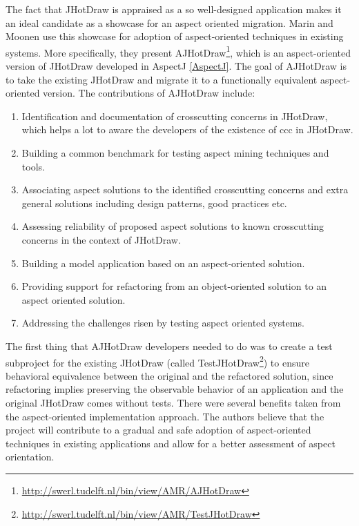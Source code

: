 The fact that JHotDraw is appraised as a so well-designed application makes it an ideal candidate as a showcase for an aspect oriented migration. 
Marin and Moonen \cite{marinajhotdraw} use this showcase for adoption of aspect-oriented techniques in existing systems. 
More specifically, they present AJHotDraw\footnote{\url{http://swerl.tudelft.nl/bin/view/AMR/AJHotDraw}}, which is an aspect-oriented version of JHotDraw developed in AspectJ \ref{AspectJ}. 
The goal of AJHotDraw is to take the existing JHotDraw and migrate it to a functionally equivalent aspect-oriented version. 
The contributions of AJHotDraw include: 

\begin{enumerate}
	\item Identification and documentation of crosscutting concerns in JHotDraw, which helps a lot to aware the developers of the existence of \ac{ccc} in JHotDraw.

	\item Building a common benchmark for testing aspect mining techniques and tools. 

	\item Associating aspect solutions to the identified crosscutting concerns and extra general solutions including design patterns, good practices etc. 

	\item Assessing reliability of proposed aspect solutions to known crosscutting concerns in the context of JHotDraw. 

	\item Building a model application based on an aspect-oriented solution.
	
	\item Providing support for refactoring from an object-oriented solution to an aspect oriented solution.
	
	\item Addressing the challenges risen by testing aspect oriented systems.
\end{enumerate}

The first thing that AJHotDraw developers needed to do was to create a test subproject for the existing JHotDraw (called TestJHotDraw\footnote{\url{http://swerl.tudelft.nl/bin/view/AMR/TestJHotDraw}}) to ensure behavioral equivalence between the original and the refactored solution, since refactoring implies preserving the observable behavior of an application\cite{fowler2009refactoring} and the original JHotDraw comes without tests. 
There were several benefits taken from the aspect-oriented implementation approach\cite{marinajhotdraw}. 
The authors believe that the project will contribute to a gradual and safe adoption of aspect-oriented techniques in existing applications and allow for a better assessment of aspect orientation.

